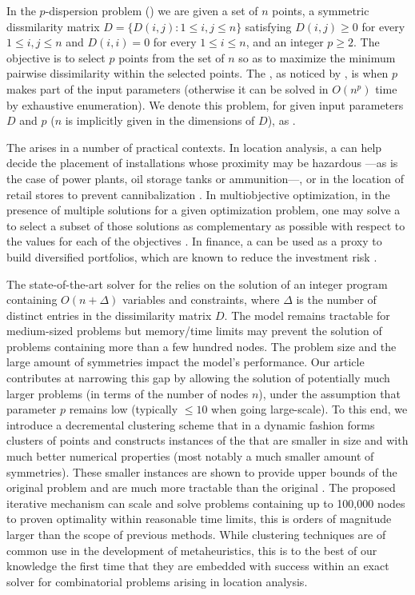 \documentclass[ijoo,nonblindrev]{informs-ijoo}
\begin{document}
In the $p$-dispersion problem (\pDP{}) we are given a set of $n$ points, a symmetric dissmilarity matrix $D = \{D(i, j): 1\leq i, j\leq n\}$ satisfying $D(i, j) \geq 0$ for every $1\leq i, j\leq n$ and $D(i, i) = 0$ for every $1\leq i\leq n$, and an integer $p\geq 2$. The objective is to select $p$ points from the set of $n$ so as to maximize the minimum pairwise dissimilarity within the selected points. The \pDP{}, as noticed by \citet{Erkut1990discrete}, is \nphard{} when $p$ makes part of the input parameters (otherwise it can be solved in $O(n^p)$ time by exhaustive enumeration). We denote this problem, for given input parameters $D$ and $p$ ($n$ is implicitly given in the dimensions of $D$), as .%

The \pDP{} arises in a number of practical contexts. In location analysis, a \pDP{} can help decide the placement of installations whose proximity may be hazardous ---as is the case of power plants, oil storage tanks or ammunition---, or in the location of retail stores to prevent cannibalization \citep{Kuby1987Programming}. In multiobjective optimization, in the presence of multiple solutions for a given optimization problem, one may solve a \pDP{} to select a subset of those solutions as complementary as possible with respect to the values for each of the objectives \citep{Saboonchi2014MaxMinMin}. In finance, a \pDP{} can be used as a proxy to build diversified portfolios, which are known to reduce the investment risk \citep{Statman1987how}.
	
The state-of-the-art solver for the \pDP{} \citep{Sayah2017new} relies on the solution of an integer program containing $O(n + \Delta)$ variables and constraints, where $\Delta$ is the number of distinct entries in the dissimilarity matrix $D$. The model remains tractable for medium-sized problems but memory/time limits may prevent the solution of problems containing more than a few hundred nodes. The problem size and the large amount of symmetries impact the model's performance. Our article contributes at narrowing this gap by allowing the solution of potentially much larger problems (in terms of the number of nodes $n$), under the assumption that parameter $p$ remains low (typically $\leq 10$ when going large-scale). To this end, we introduce a decremental clustering scheme that in a dynamic fashion forms clusters of points and constructs instances of the \pDP{} that are smaller in size and with much better numerical properties (most notably a much smaller amount of symmetries). These smaller instances are shown to provide upper bounds of the original problem and are much more tractable than the original \pDP{}. The proposed iterative mechanism can scale and solve problems containing up to 100,000 nodes to proven optimality within reasonable time limits, this is orders of magnitude larger than the scope of previous methods. While clustering techniques are of common use in the development of metaheuristics, this is to the best of our knowledge the first time that they are embedded with success within an exact solver for combinatorial problems arising in location analysis.
\end{document}
